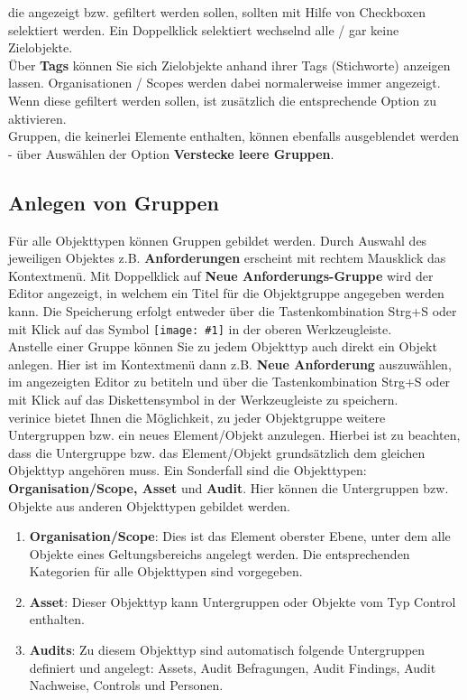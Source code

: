 \documentclass[a4paper,10pt]{book}
\newcommand{\icon}[1]{\texttt{[image: \#1]}}
\begin{document}
die angezeigt bzw. gefiltert werden sollen, sollten mit Hilfe von Checkboxen selektiert werden. Ein Doppelklick selektiert
wechselnd alle / gar keine Zielobjekte.
\newline\\
Über \textbf{Tags} können Sie sich Zielobjekte anhand ihrer Tags (Stichworte) anzeigen lassen. Organisationen / Scopes werden dabei normalerweise
immer angezeigt. Wenn diese gefiltert werden sollen, ist zusätzlich die entsprechende Option zu aktivieren.
\newline\\
Gruppen, die keinerlei Elemente enthalten, können ebenfalls ausgeblendet werden - über Auswählen der Option \textbf{Verstecke leere Gruppen}.

\subsection{Anlegen von Gruppen}
Für alle Objekttypen können Gruppen gebildet werden. Durch Auswahl des jeweiligen Objektes z.B. \textbf{Anforderungen} erscheint mit rechtem
Mausklick das Kontextmenü. Mit Doppelklick auf \textbf{Neue Anforderungs-Gruppe} wird der Editor angezeigt, in welchem ein Titel für die
Objektgruppe angegeben werden kann. Die Speicherung erfolgt entweder über die Tastenkombination Strg+S oder mit Klick auf das Symbol
\icon{Icon/Disk.png} in der oberen Werkzeugleiste.
\newline\\
Anstelle einer Gruppe können Sie zu jedem Objekttyp auch direkt ein Objekt anlegen. Hier ist im Kontextmenü dann z.B. \textbf{Neue Anforderung}
auszuwählen, im angezeigten Editor zu betiteln und über die Tastenkombination Strg+S oder mit Klick auf das Diskettensymbol in der Werkzeugleiste zu speichern.
\newline\\
verinice bietet Ihnen die Möglichkeit, zu jeder Objektgruppe weitere Untergruppen bzw. ein neues Element/Objekt anzulegen.
Hierbei ist zu beachten, dass die Untergruppe bzw. das Element/Objekt grundsätzlich dem gleichen Objekttyp angehören muss.
Ein Sonderfall sind die Objekttypen: \textbf{Organisation/Scope, Asset} und \textbf{Audit}. Hier können die Untergruppen bzw.
Objekte aus anderen Objekttypen gebildet werden.
\begin{enumerate}
\item \textbf{Organisation/Scope}: Dies ist das Element oberster Ebene, unter dem alle Objekte eines Geltungsbereichs angelegt werden.
Die entsprechenden Kategorien für alle Objekttypen sind vorgegeben.
\item \textbf{Asset}: Dieser Objekttyp kann Untergruppen oder Objekte vom Typ Control enthalten.
\item \textbf{Audits}: Zu diesem Objekttyp sind automatisch folgende Untergruppen definiert und angelegt: Assets, Audit Befragungen, Audit Findings, Audit Nachweise, Controls und Personen.
\end{enumerate}
\end{document}
